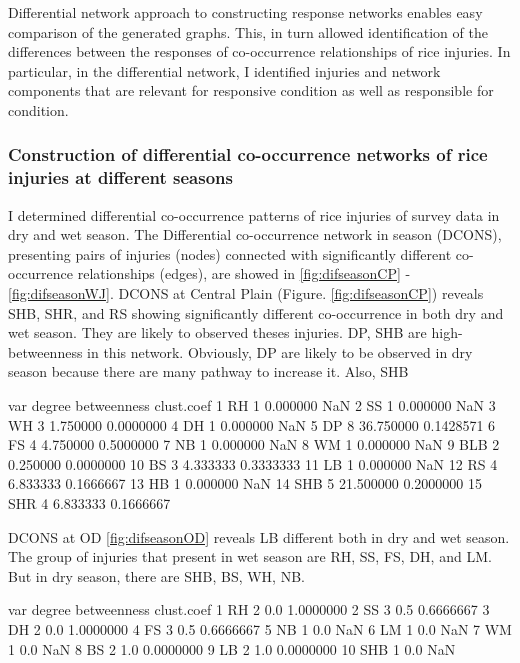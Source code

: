 Differential network approach to constructing response networks enables easy comparison of the generated graphs. This, in turn allowed identification of the differences between the responses of co-occurrence relationships of rice injuries. In particular, in the differential network, I identified injuries and network components that are relevant for responsive condition as well as responsible for condition. 


\subsubsection{Construction of differential co-occurrence networks of rice injuries at different seasons}

I determined differential co-occurrence patterns of rice injuries of survey data in dry and wet season. The Differential co-occurrence network in season (DCONS), presenting pairs of injuries (nodes) connected with significantly different co-occurrence relationships (edges), are showed in \ref{fig:difseasonCP} - \ref{fig:difseasonWJ}. DCONS at Central Plain (Figure. \ref{fig:difseasonCP}) reveals SHB, SHR, and RS showing significantly different co-occurrence in both dry and wet season. They are likely to observed theses injuries. DP, SHB are high-betweenness in this network. Obviously, DP are likely to be observed in dry season because there are many pathway to increase it. Also, SHB  


   var degree betweenness clust.coef
1   RH      1    0.000000        NaN
2   SS      1    0.000000        NaN
3   WH      3    1.750000  0.0000000
4   DH      1    0.000000        NaN
5   DP      8   36.750000  0.1428571
6   FS      4    4.750000  0.5000000
7   NB      1    0.000000        NaN
8   WM      1    0.000000        NaN
9  BLB      2    0.250000  0.0000000
10  BS      3    4.333333  0.3333333
11  LB      1    0.000000        NaN
12  RS      4    6.833333  0.1666667
13  HB      1    0.000000        NaN
14 SHB      5   21.500000  0.2000000
15 SHR      4    6.833333  0.1666667


DCONS at OD \ref{fig:difseasonOD} reveals LB different both in dry and wet season. The group of injuries that present in wet season are RH, SS, FS, DH, and LM. But in dry season, there are SHB, BS, WH, NB.

var degree betweenness clust.coef
1   RH      2         0.0  1.0000000
2   SS      3         0.5  0.6666667
3   DH      2         0.0  1.0000000
4   FS      3         0.5  0.6666667
5   NB      1         0.0        NaN
6   LM      1         0.0        NaN
7   WM      1         0.0        NaN
8   BS      2         1.0  0.0000000
9   LB      2         1.0  0.0000000
10 SHB      1         0.0        NaN

